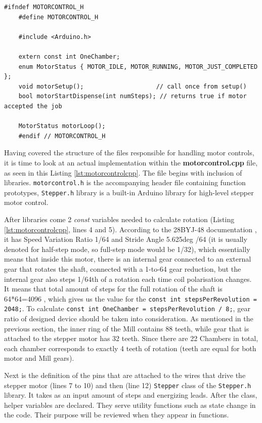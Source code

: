 \begin{lstlisting}[style=cppstyle, caption={Header for Motor Control Interface}, label={lst:motorcontrolh}]
	#ifndef MOTORCONTROL_H
	#define MOTORCONTROL_H
	
	#include <Arduino.h>
	
	extern const int OneChamber;         
	enum MotorStatus { MOTOR_IDLE, MOTOR_RUNNING, MOTOR_JUST_COMPLETED };
	void motorSetup();                    // call once from setup()
	bool motorStartDispense(int numSteps); // returns true if motor accepted the job
	
	MotorStatus motorLoop();
	#endif // MOTORCONTROL_H
\end{lstlisting}
Having covered the structure of the files responsible for handling motor controls, it is time to look at an actual implementation within the \textbf{motorcontrol.cpp} file, as seen in this Listing \ref{lst:motorcontrolcpp}. The file begins with inclusion of libraries. \texttt{motorcontrol.h} is the accompanying header file containing function prototypes, \texttt{Stepper.h} library is a built-in Arduino library for high-level stepper motor control. 

After libraries come 2 \textit{const} variables needed to calculate rotation (Listing \ref{lst:motorcontrolcpp}, lines 4 and 5). According to the 28BYJ-48 documentation \cite{stepper}, it has Speed Variation Ratio 1/64 and Stride Angle 5.625deg /64 (it is usually denoted for half-step mode, so full-step mode would be 1/32), which essentially means that inside this motor, there is an internal gear connected to an external gear that rotates the shaft, connected with a 1-to-64 gear reduction, but the internal gear also steps 1/64th of a rotation each time coil polarisation changes. It means that total amount of steps for the full rotation of the shaft is 64*64=4096 , which gives us the value for the \texttt{const int stepsPerRevolution = 2048;}. To calculate \texttt{const int OneChamber = stepsPerRevolution / 8;}, gear ratio of designed device should be taken into consideration. As mentioned in the previous section, the inner ring of the Mill contains 88 teeth, while gear that is attached to the stepper motor has 32 teeth. Since there are 22 Chambers in total, each chamber corresponds to exactly 4 teeth of rotation (teeth are equal for both motor and Mill gears). 

Next is the definition of the pins that are attached to the wires that drive the stepper motor (lines 7 to 10) and then (line 12) \texttt{Stepper} class of the \texttt{Stepper.h} library. It takes as an input amount of steps and energizing leads. After the class, helper variables are declared. They serve utility functions such as state change in the code. Their purpose will be reviewed when they appear in functions. 

